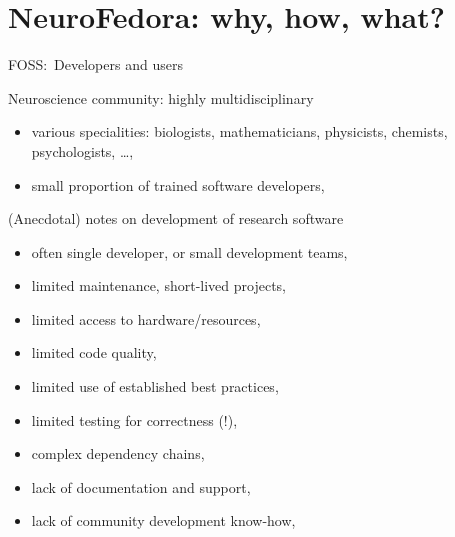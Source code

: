 \section{NeuroFedora: why, how, what?}
\begin{frame}[c]{FOSS:\ Developers and users}
  \begin{figure}[h]
  \begin{center}
  \end{center}
  \end{figure}
\end{frame}
\begin{frame}[c]{Neuroscience community: highly multidisciplinary}
  \begin{itemize}
    \item \alert{various specialities:} biologists, mathematicians, physicists, chemists, psychologists, \ldots, 
      \pause{}
    \item \alert{small proportion of trained software developers},
  \end{itemize}
\end{frame}
\begin{frame}[c]{(Anecdotal) notes on development of research software}
  \begin{itemize}
    \item often \alert{single developer}, or small development teams,
    \item limited \alert{maintenance, short-lived projects},
    \item limited \alert{access to hardware/resources},
    \item limited \alert{code quality},
    \item limited \alert{use of established best practices},
    \item limited \alert{testing for correctness (!)},
    \item \alert{complex dependency chains},
    \item lack of \alert{documentation and support},
    \item lack of \alert{community development know-how},
  \end{itemize}
\end{frame}
